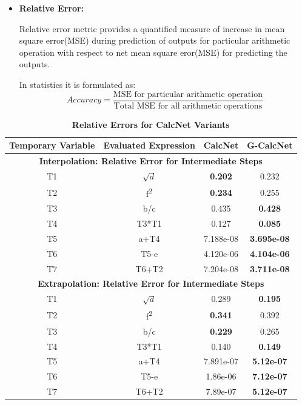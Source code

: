 \documentclass[conference]{IEEEtran}
\begin{document}
\begin{itemize}
\item \textbf{Relative Error:}

Relative error metric provides a quantified measure of increase in mean square error(MSE) during prediction of outputs for particular arithmetic operation with respect to net mean square eror(MSE) for predicting the outputs.

In statistics it is formulated as:\\
\[Accuracy =\frac{\text{MSE for particular arithmetic operation}}{\text{Total MSE for all arithmetic operations}}\]
\end{itemize}

\bgroup
\def\arraystretch{1.5}
\begin{table}[h!]
  \begin{center}
    \caption{\textbf{Relative Errors for CalcNet Variants}}
    \label{tab:table2}
    \begin{tabular}{|c|c|c|c|}
    
    \hline
      \textbf{Temporary Variable} & \textbf{Evaluated Expression} & \textbf{CalcNet} & \textbf{G-CalcNet}\\
    \hline    
      \multicolumn{4}{c}{\textbf{Interpolation: Relative Error for Intermediate Steps}} \\

    \hline
	  T1  & $\sqrt{d}$ & \textbf{0.202} & 0.232 \\
	\hline	
	  T2 & f\textsuperscript{2}	& \textbf{0.234} & 0.255 \\
	\hline
	  T3 & b/c & 0.435  & \textbf{0.428}\\
	\hline
	  T4 & T3*T1  & 0.127  & \textbf{0.085}\\
	\hline
	  T5 & a+T4 &  7.188e-08  & \textbf{3.695e-08}\\
	 \hline
	  T6 & T5-e  &  4.120e-06  & \textbf{4.104e-06}\\
	 \hline
	  T7 & T6+T2 &  7.204e-08  & \textbf{3.711e-08}\\
	 \hline	  

      \multicolumn{4}{c}{\textbf{Extrapolation: Relative Error for Intermediate Steps}} \\

    \hline
	  T1  & $\sqrt{d}$ & 0.289 & \textbf{0.195}\\
	\hline	
	  T2 & f\textsuperscript{2}	& \textbf{0.341} & 0.392 \\
	\hline
	  T3 & b/c & \textbf{0.229} & 0.265 \\
	\hline
	  T4 & T3*T1  & 0.140  & \textbf{0.149}\\
	\hline
	  T5 & a+T4 &  7.891e-07 & \textbf{5.12e-07}\\
	 \hline
	  T6 & T5-e  &  1.86e-06  & \textbf{7.12e-07}\\
	 \hline
	  T7 & T6+T2 &  7.89e-07  & \textbf{5.12e-07}\\

    \hline 
    \end{tabular}
  \end{center}
\end{table}
\egroup
\end{document}
